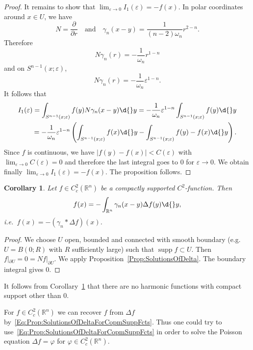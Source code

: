 \documentclass[12pt, oneside, a4paper]{article}
\newtheorem{cor}[thm]{Corollary}
\def\supp{\operatorname{supp}}
\theoremstyle{dfn}
\def\Rbb{\ensuremath{\mathbb{R}}}
\providecommand{\abs}[1]{\lvert#1\rvert}
\begin{document}
\begin{proof}
It remains to show that $\lim_{\varepsilon \to 0} I_1(\varepsilon) = -f(x)$. In polar coordinates around $x \in U$, we have
\[
N = \frac{\partial}{\partial r}
\quad
\text{and}
\quad
\gamma_n (x-y) = \frac{1}{(n-2) \omega_n} r^{2-n}.
\]
Therefore
\[
N \gamma_n(r) = - \frac{1}{\omega_n} r^{1-n}
\]
and on $S^{n-1}(x;\varepsilon)$,
\[
N \gamma_n(r) = - \frac{1}{\omega_n} \varepsilon^{1-n}.
\]
It follows that
\begin{align*}
	I_1(\varepsilon)
	= \int_{S^{n-1}(x;\varepsilon)} f(y) N\gamma_n(x-y) \d{}y
	= - \frac{1}{\omega_n} \varepsilon^{1-n} \int_{S^{n-1}(x;\varepsilon)} f(y) \d{}y \\
	= - \frac{1}{\omega_n} \varepsilon^{1-n} \left( \int_{S^{n-1}(x;\varepsilon)} f(x) \d{}y - \int_{S^{n-1}(x;\varepsilon)} f(y) - f(x) \d{}y \right).
\end{align*}
Since $f$ is continuous, we have $\abs{f(y) - f(x)} < C(\varepsilon)$ with $\lim_{\varepsilon \to 0} C(\varepsilon) = 0$ and therefore the last integral goes to $0$ for $\varepsilon \to 0$. We obtain finally $\lim_{\varepsilon \to 0} I_1(\varepsilon) = -f(x)$. The proposition follows.
\end{proof}

\begin{cor}\label{Cor:SolutionsOfDeltaForCompaclySuppFcts}
Let $f \in C^2_c(\Rbb^n)$ be a compactly supported $C^2$-function. Then
\begin{equation}\label{Eq:Prop:SolutionsOfDeltaForCopmSuppFcts}
f(x) = - \int_{\Rbb^n} \gamma_n(x-y) \Delta f(y) \d{}y,
\end{equation}
i.e.\ $f(x) = -(\gamma_n * \Delta f)(x)$.
\end{cor}

\begin{proof}
We choose $U$ open, bounded and connected with smooth boundary (e.g.\ $U = B(0;R)$ with $R$ sufficiently large) such that $\supp f \subset U$. Then $f|_{\partial U} = 0 = Nf|_{\partial U}$. We apply Proposition~\ref{Prop:SolutionsOfDelta}. The boundary integral gives $0$.
\end{proof}

It follows from Corollary~\ref{Cor:SolutionsOfDeltaForCompaclySuppFcts} that there are no harmonic functions with compact support other than $0$.

For $f \in C^2_c(\Rbb^n)$ we can recover $f$ from $\Delta f$ by~\eqref{Eq:Prop:SolutionsOfDeltaForCopmSuppFcts}. Thus one could try to use~\eqref{Eq:Prop:SolutionsOfDeltaForCopmSuppFcts} in order to solve the Poisson equation $\Delta f = \varphi$ for $\varphi \in C^2_c(\Rbb^n)$.
\end{document}
